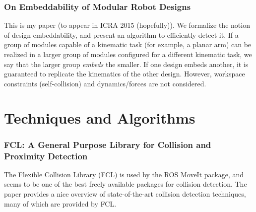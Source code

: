 \documentclass[12pt]{article}
\begin{document}
\subsubsection*{On Embeddability of Modular Robot Designs \cite{mantzouratos2014embeddability}}
This is my paper (to appear in ICRA 2015 (hopefully)).  We formalize the notion of
design embeddability, and present an algorithm to efficiently detect it.  If a group of modules capable of a kinematic
task (for example, a planar arm) can be realized in a larger group of modules configured for a different kinematic
task, we say that the larger group \textit{embeds} the smaller.
If one design embeds another, it is guaranteed to replicate the kinematics of the
other design.  However, workspace constraints (self-collision) and dynamics/forces
are not considered.



\section*{Techniques and Algorithms}

\subsubsection*{FCL: A General Purpose Library for Collision and Proximity Detection
\cite{pan2012fcl}}
The Flexible Collision Library (FCL) is used by the ROS MoveIt package, and seems
to be one of the best freely available packages for collision detection. The paper
provides a nice overview of state-of-the-art collision detection techniques, many
of which are provided by FCL.
 


\end{document}
